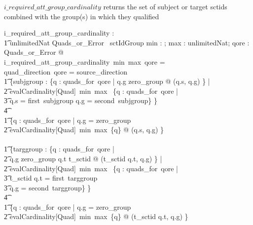 \documentclass{article}
\begin{document}
$i\_required\_att\_group\_cardinality$ returns the set of subject or target sctids combined with the group(s) in which they qualified
\begin{gendef}
   i\_required\_att\_group\_cardinality : \\
\t1 \nat \fun unlimitedNat \fun Quads\_or\_Error \ \fun \power sctIdGroup
\where
   \forall min : \nat; max : unlimitedNat; qore : Quads\_or\_Error  @ \\
i\_required\_att\_group\_cardinality~min~max~qore = \\
\IF quad\_direction~qore = source\_direction \THEN \\
\t1 \{subjgroup :  \{q : quads\_for~qore | q.g \neq zero\_group @ (q.s, q.g) \} | \\
\t2 evalCardinality[Quad]~min~max~ \{q : quads\_for~qore | \\
\t3 q.s = first~subjgroup \land q.g = second~subjgroup\} \neq \emptyset \}  \\
\t4 \cup \\
\t1 \{q : quads\_for~qore | q.g = zero\_group \land  \\
\t2 evalCardinality[Quad]~min~max~\{q\} \neq \emptyset @ (q.s, q.g) \} \\
\also
\ELSE \\
\t1 \{targgroup :  \{q : quads\_for~qore | \\
\t2 q.g \neq zero\_group \land q.t \in \ran t\_sctid @ (t\_sctid \inv q.t, q.g) \} | \\
\t2 evalCardinality[Quad]~min~max~ \{q : quads\_for~qore | \\
\t3 t\_sctid \inv q.t = first~targgroup \land \\
\t3 q.g = second~targgroup\} \neq \emptyset \} \\
\t4 \cup \\
\t1 \{q : quads\_for~qore | q.g = zero\_group \land  \\
\t2 evalCardinality[Quad]~min~max~\{q\} \neq \emptyset @ (t\_sctid \inv q.t, q.g) \} \\
\end{gendef}
\end{document}
